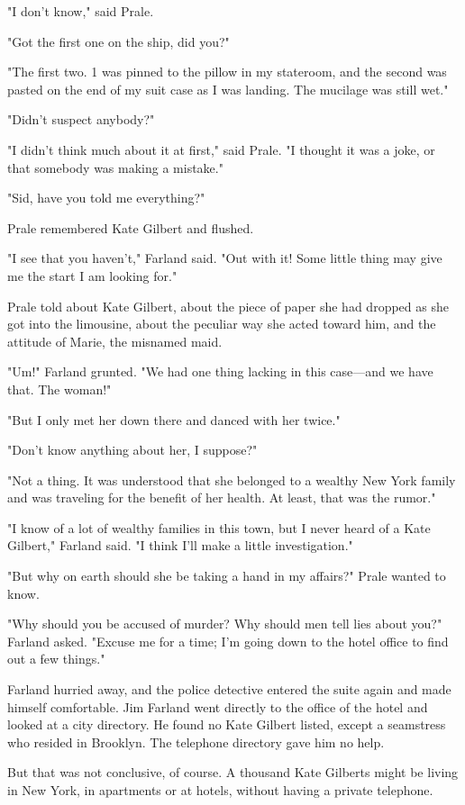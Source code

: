 \documentclass{novel}
\begin{document}
"I don't know," said Prale.

"Got the first one on the ship, did you?"

"The first two. 1 was pinned to the pillow in my stateroom, and the second was pasted on the end of my suit case as I was landing. The mucilage was still wet."

"Didn't suspect anybody?"

"I didn't think much about it at first," said Prale. "I thought it was a joke, or that somebody was making a mistake."

"Sid, have you told me everything?"

Prale remembered Kate Gilbert and flushed.

"I see that you haven't," Farland said. "Out with it! Some little thing may give me the start I am looking for."

Prale told about Kate Gilbert, about the piece of paper she had dropped as she got into the limousine, about the peculiar way she acted toward him, and the attitude of Marie, the misnamed maid.

"Um!" Farland grunted. "We had one thing lacking in this case---and we have that. The woman!"

"But I only met her down there and danced with her twice."

"Don't know anything about her, I suppose?"

"Not a thing. It was understood that she belonged to a wealthy New York family and was traveling for the benefit of her health. At least, that was the rumor."

"I know of a lot of wealthy families in this town, but I never heard of a Kate Gilbert," Farland said. "I think I'll make a little investigation."

"But why on earth should she be taking a hand in my affairs?" Prale wanted to know.

"Why should you be accused of murder? Why should men tell lies about you?" Farland asked. "Excuse me for a time; I'm going down to the hotel office to find out a few things."

Farland hurried away, and the police detective entered the suite again and made himself comfortable. Jim Farland went directly to the office of the hotel and looked at a city directory. He found no Kate Gilbert listed, except a seamstress who resided in Brooklyn. The telephone directory gave him no help.

But that was not conclusive, of course. A thousand Kate Gilberts might be living in New York, in apartments or at hotels, without having a private telephone.
\end{document}
